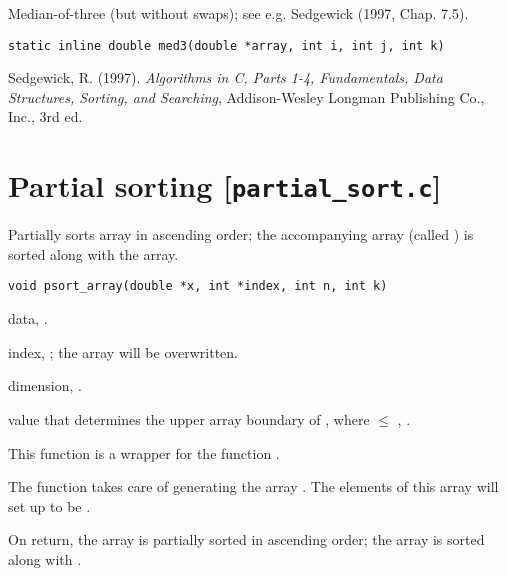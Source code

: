 \documentclass[a4paper,oneside,10pt,DIV=12]{scrartcl}
\def\DATA#1#2#3{
	\item[\code{#1}] #2, \code{double array[#3]}.}
\begin{document}
\begin{Description}
Median-of-three (but without swaps); see e.g. Sedgewick (1997, Chap. 7.5).
\end{Description}
\begin{Usage}
\begin{verbatim}
static inline double med3(double *array, int i, int j, int k)
\end{verbatim}
\end{Usage}
\begin{References}
Sedgewick, R. (1997). \textit{Algorithms in C, Parts 1-4, Fundamentals, Data
Structures, Sorting, and Searching}, Addison-Wesley Longman Publishing Co.,
Inc., 3rd ed.
\end{References}


\section{Partial sorting [\texttt{partial\_sort.c}]}

\begin{Description}
Partially sorts array  in ascending order; the accompanying
 array (called ) is sorted along with the array.
\end{Description}
\begin{Usage}
\begin{verbatim}
void psort_array(double *x, int *index, int n, int k)
\end{verbatim}
\end{Usage}
\begin{Arguments}
	\begin{ldescription}
		\DATA{x}{data}{n}
		\item[\code{index}] index, ; the array will be
			overwritten.
		\item[\code{n}] dimension, \code{[int]}.
		\item[\code{k}] value that determines the upper array boundary of
			, where  $\leq$ , \code{[int]}.
	\end{ldescription}
\end{Arguments}
\begin{Details}
This function is a wrapper for the function
.

The function takes care of generating the array . The elements of
this array will set up to be .
\end{Details}
\begin{Dependency}
\end{Dependency}
\begin{Value}
On return, the array  is partially sorted in ascending order;
the array  is sorted along with .
\end{Value}
\end{document}
